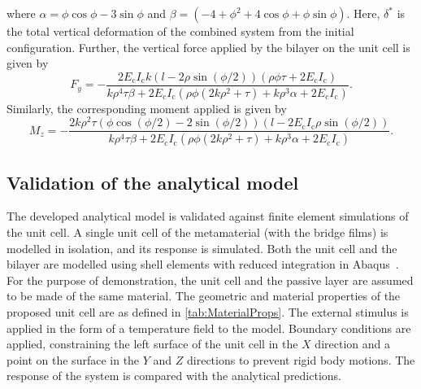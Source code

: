 \documentclass[final,times,5p]{elsarticle}
\numberwithin{equation}{section}
\begin{document}
where $\alpha=\phi \cos{\phi}-3 \sin{\phi}$ and $\beta=(-4+\phi^2+4 \cos{\phi}+\phi\sin{\phi})$. Here, $\delta^*$ is the total vertical deformation of the combined system from the initial configuration.
%
Further, the vertical force applied by the bilayer on the unit cell is given by
\begin{equation}
   F_y=-\frac{2 E_\mathrm{c}I_\mathrm{c} k (l-2 \rho \sin(\phi/2))(\rho \phi \tau + 2E_\mathrm{c}I_\mathrm{c})}{k \rho^4 \tau\beta+ 2E_\mathrm{c}I_\mathrm{c}(\rho \phi(2 k \rho^2+\tau)+k\rho^3\alpha+2E_\mathrm{c}I_\mathrm{c})}.
\end{equation}
Similarly, the corresponding moment applied is given by
\begin{equation}
   M_z=-\frac{2 k \rho^2 \tau (\phi\cos(\phi/2)-2\sin(\phi/2))(l-2 E_\mathrm{c}I_\mathrm{c} \rho \sin(\phi/2))}{k \rho^4 \tau\beta+ 2E_\mathrm{c}I_\mathrm{c}(\rho \phi(2 k \rho^2+\tau)+k\rho^3\alpha+2E_\mathrm{c}I_\mathrm{c})}.
\end{equation}
\subsection{Validation of the analytical model}
The developed analytical model is validated against finite element simulations of the unit cell. A single unit cell of the metamaterial (with the bridge films) is modelled in isolation, and its response is simulated. Both the unit cell and the bilayer are modelled using shell elements with reduced integration in Abaqus~\cite{simulia2012abaqus}. For the purpose of demonstration, the unit cell and the passive layer are assumed to be made of the same material. The geometric and material properties of the proposed unit cell are as defined in \cref{tab:MaterialProps}. The external stimulus is applied in the form of a temperature field to the model. Boundary conditions are applied, constraining the left surface of the unit cell in the $X$ direction and a point on the surface in the $Y$ and $Z$ directions to prevent rigid body motions. The response of the system is compared with the analytical predictions. 
\end{document}

